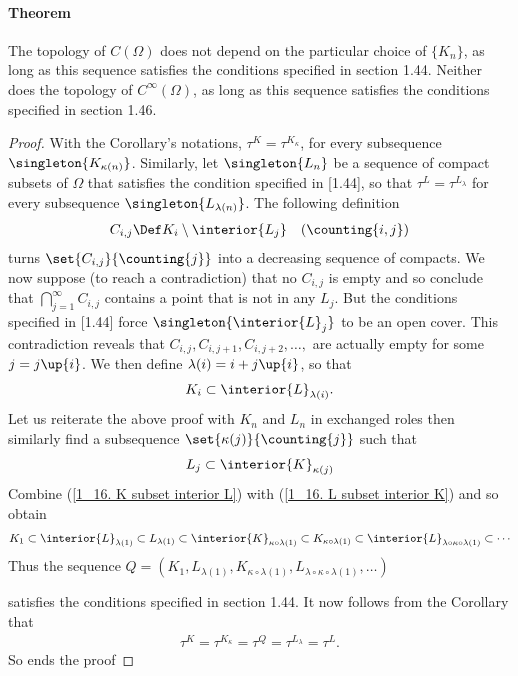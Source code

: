 \paragraph{Theorem} 
The topology of $C(\Omega)$ does not depend on the particular choice of 
$\{K_{n}\}$, as long as this sequence satisfies the conditions 
specified in section 1.44. Neither does the topology of $C^\infty (\Omega)$, 
as long as this sequence satisfies the conditions specified in section 1.46.
%
\begin{proof}%
With the Corollary's notations,
% 
  $\tau^{K} = \tau^{K_\kappa}$,
%
for every subsequence $\singleton{K_{\kappa(n)}}$.
% 
Similarly, let 
%
  $\singleton{L_n}$ 
% 
be a sequence of compact subsets of $\Omega$ that satisfies 
the condition specified in [1.44], 
so that 
%
  $\tau^{L} = \tau^{L_\lambda}$
%
for every subsequence $\singleton{L_{\lambda(n)}}$. 
%
The following definition
%
  \begin{align}
    C_{i, j} \Def K_i \setminus \interior{L_j} \quad (\counting{i, j})
  \end{align}
%
turns $\set{C_{i, j}}{\counting{j}}$ into a decreasing sequence of compacts.
%
We now suppose (to reach a contradiction) that 
% 
  no $C_{i,j}$ is empty 
% 
and so conclude that 
% 
  $\bigcap_{j=1}^\infty C_{i, j}$ 
%
contains a point that is not in any $L_j$. 
But the conditions specified in [1.44] force 
% 
  $\singleton{\interior{L}_j}$ 
%
to be an open cover.
% 
This contradiction reveals that $C_{i,j}, C_{i, j+1}, C_{i, j+2}, \dots,$  
are actually empty for some $j=j\up{i}$. We then define  
%
  $\lambda(i) = i + j\up{i}$, 
% 
so that
%
  \begin{align}
    \label{1_16. K subset interior L}
    K_i 
      \subset 
    \interior{L}_{\lambda(i)}.
  \end{align} 
%
Let us reiterate the above proof with $K_n$ and $L_n$ in exchanged roles 
then similarly find a subsequence $\set{\kappa(j)}{\counting{j}}$ such that 
%
  \begin{align}
  \label{1_16. L subset interior K}
    L_j \subset \interior{K}_{\kappa(j)}
  \end{align}
%
Combine 
%
  (\ref{1_16. K subset interior L}) with 
  (\ref{1_16. L subset interior K}) 
%
and so obtain
%
  \begin{align}
    K_1 
      \subset 
    \interior{L}_{\lambda(1)} 
      \subset 
    L_{\lambda(1)} 
      \subset 
    \interior{K}_{\kappa\circ\lambda(1)}
      \subset 
    K_{\kappa\circ\lambda(1)}
      \subset
    \interior{L}_{\lambda\circ\kappa\circ\lambda(1)}
      \subset
    \cdots
  \end{align}
%
Thus the sequence 
%
  $Q = (
    K_1, 
    L_{\lambda(1)}, 
    K_{\kappa\circ\lambda(1)}, 
    L_{\lambda\circ\kappa\circ\lambda(1)},
    \dots
  )$

satisfies the conditions specified in section 1.44. 
It now follows from the Corollary that 
%
  \begin{align}  
    \tau^{K} 
    = 
      \tau^{K_\kappa} 
    = 
      \tau^{Q} 
    = 
      \tau^{L_\lambda} 
    = \tau^{L}.
  \end{align} 
%
So ends the proof
\end{proof}
